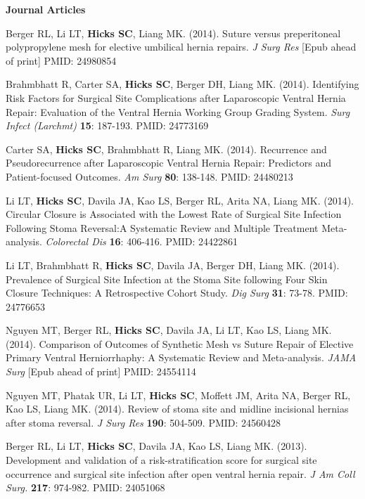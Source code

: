 \documentclass[10pt]{article}
\renewcommand{\section}[2]%
        {\pagebreak[2]\vspace{1.3\baselineskip}%
         \phantomsection\addcontentsline{toc}{section}{#1}%
         \hspace{0in}%
         \marginpar{
         \raggedright \scshape #1}#2}
\begin{document}
\section{Research}  
\textbf{Journal Articles}
\begin{enumerate}[label= {[\arabic*]}]
\item Berger RL, Li LT, {\bf Hicks SC}, Liang MK. (2014). Suture versus preperitoneal polypropylene mesh for elective umbilical hernia repairs. {\it J Surg Res} [Epub ahead of print] PMID: 24980854 
\item Brahmbhatt R, Carter SA, {\bf Hicks SC}, Berger DH, Liang MK. (2014). Identifying Risk Factors for Surgical Site Complications after Laparoscopic Ventral Hernia Repair: Evaluation of the Ventral Hernia Working Group Grading System. {\it Surg Infect (Larchmt)} {\bf 15}: 187-193. PMID: 24773169
\item Carter SA, {\bf Hicks SC}, Brahmbhatt R, Liang MK. (2014). Recurrence and Pseudorecurrence after Laparoscopic Ventral Hernia Repair: Predictors and Patient-focused Outcomes. {\it Am Surg} {\bf 80}: 138-148. PMID: 24480213
\item Li LT, {\bf Hicks SC}, Davila JA, Kao LS, Berger RL, Arita NA, Liang MK. (2014). Circular Closure is Associated with the Lowest Rate of Surgical Site Infection Following Stoma Reversal:A Systematic Review and Multiple Treatment Meta-analysis. {\it Colorectal Dis} {\bf 16}: 406-416. PMID: 24422861
\item Li LT, Brahmbhatt R, {\bf Hicks SC}, Davila JA, Berger DH, Liang MK. (2014). Prevalence of Surgical Site Infection at the Stoma Site following Four Skin Closure Techniques: A Retrospective Cohort Study. {\it Dig Surg} {\bf 31}: 73-78. PMID: 24776653
\item Nguyen MT, Berger RL, {\bf Hicks SC}, Davila JA, Li LT, Kao LS, Liang MK. (2014). Comparison of Outcomes of Synthetic Mesh vs Suture Repair of Elective Primary Ventral Herniorrhaphy: A Systematic Review and Meta-analysis. {\it JAMA Surg} [Epub ahead of print] PMID: 24554114 
\item Nguyen MT, Phatak UR, Li LT, {\bf Hicks SC}, Moffett JM, Arita NA, Berger RL, Kao LS, Liang MK. (2014). Review of stoma site and midline incisional hernias after stoma reversal. {\it J Surg Res} {\bf 190}: 504-509. PMID: 24560428 
\item Berger RL, Li LT, {\bf Hicks SC}, Davila JA, Kao LS, Liang MK. (2013). Development and validation of a risk-stratification score for surgical site occurrence and surgical site infection after open ventral hernia repair. {\it J Am Coll Surg.} {\bf 217}: 974-982. PMID: 24051068

\end{enumerate}
\end{document}
